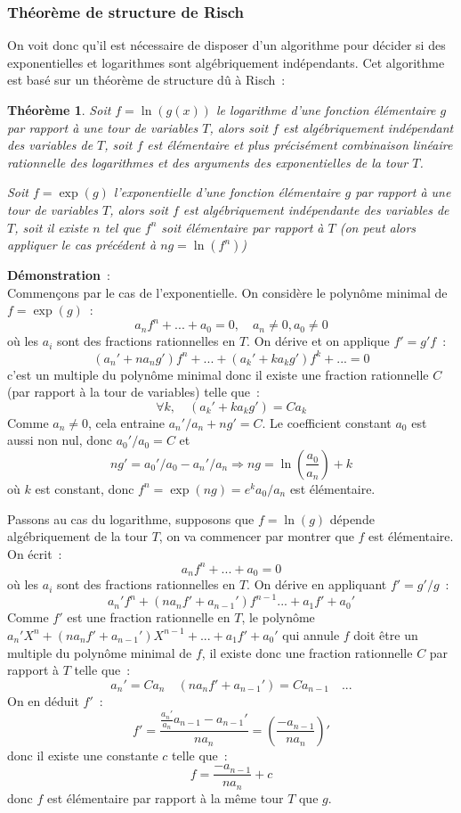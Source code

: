 \documentclass[a4paper,11pt]{article}
\newtheorem{thm}{Théorème}
\begin{document}
\begin{giacjshere}
\subsubsection{Théorème de structure de Risch}
On voit donc qu'il est nécessaire de disposer d'un algorithme
pour décider si des exponentielles et logarithmes sont
algébriquement indépendants. Cet algorithme est basé sur
un théorème de structure dû à Risch~:
\begin{thm}
Soit $f=\ln(g(x))$ le logarithme d'une fonction élémentaire
$g$ par rapport à une tour de variables $T$, alors soit $f$
est algébriquement indépendant des variables de $T$, soit $f$ est
élémentaire et plus précisément combinaison linéaire rationnelle
des logarithmes et des arguments des exponentielles de la tour $T$.

Soit $f=\exp(g)$ l'exponentielle d'une fonction élémentaire $g$
par rapport à une tour de variables $T$, alors soit $f$
est algébriquement indépendante des variables de $T$, soit
il existe $n$ tel que $f^n$ soit élémentaire par rapport à $T$ 
(on peut alors appliquer le cas précédent à $ng=\ln(f^n)$)
\end{thm}

{\bf Démonstration}~:\\
Commençons par le cas de l'exponentielle. On considère le polynôme minimal
de $f=\exp(g)$~:
\[ a_n f^n+...+a_0=0, \quad a_n \neq 0 , a_0 \neq 0\]
où les $a_i$ sont des fractions rationnelles en $T$. On dérive
et on applique $f'=g'f$~:
\[ (a_n'+n a_n g') f^n +   ... + ( a_{k}' + ka_k g')f^{k} +... =0\]
c'est un multiple du polynôme minimal donc il existe une fraction rationnelle
$C$ (par rapport à la tour de variables) telle que~:
\[ \forall k, \quad (a_k'+k a_k g') = C a_k\]
Comme $a_n\neq 0$, cela entraine $a_n'/a_n+ng'=C$. Le coefficient
constant $a_0$ est aussi non nul, donc $a_0'/a_0=C$ et 
\[ n g' = a_0'/a_0 - a_n'/a_n \Rightarrow ng=\ln(\frac{a_0}{a_n}) + k\]
où $k$ est constant, donc $f^n=\exp(ng)=e^k a_0/a_n$ est élémentaire.

Passons au cas du logarithme, supposons que $f=\ln(g)$ dépende
algébriquement de la tour $T$, on va commencer par montrer que
$f$ est élémentaire. On écrit~:
\[ a_n f^n+...+a_0=0\]
où les $a_i$ sont des fractions rationnelles en $T$. On dérive en
appliquant $f'=g'/g$~:
\[ a_n' f^n + (n a_n f' + a_{n-1}')f^{n-1}  ... + a_1 f'+a_0 '\]
Comme $f'$ est une fraction rationnelle en $T$, le polynôme
$a_n' X^n + (n a_n f'+a_{n-1}') X^{n-1}+...+ a_1 f'+a_0'$ qui annule $f$
doit être un multiple du polynôme minimal de $f$, il existe donc
une fraction rationnelle $C$ par rapport à $T$ telle que~:
\[ a_n' = C a_n \quad (n a_n f'+a_{n-1}') = C a_{n-1} \quad ... \]
On en déduit $f'$~:
\[ f'=\frac{\frac{a_n'}{a_n} a_{n-1}-a_{n-1}'}{n a_n} = 
\left(\frac{-a_{n-1}}{n a_n}\right)'\]
donc il existe une constante $c$ telle que~:
\[ f=\frac{-a_{n-1}}{n a_n}+c\]
donc $f$ est élémentaire par rapport à la même tour $T$ que $g$.


\end{giacjshere}
\end{document}
